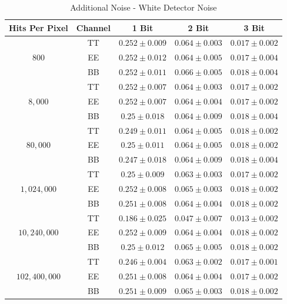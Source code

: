 \documentclass[apj]{emulateapj}
\begin{document}
\def\arraystretch{1.3}
\begin{table}[tbh]
\begin{center}
\caption{\label{tab:extranoisewhite} Additional Noise - White Detector Noise}
\small
\begin{tabular}{c c c c c}
Hits Per Pixel & Channel & 1 Bit & 2 Bit & 3 Bit \\
\hline
\hline
\multirow{3}{*}{$800$}  & TT  & $ 0.252 \pm 0.009 $  & $ 0.064 \pm 0.003 $  & $ 0.017 \pm 0.002 $ \\
& EE  & $ 0.252 \pm 0.012 $  & $ 0.064 \pm 0.005 $  & $ 0.017 \pm 0.004 $ \\
& BB  & $ 0.252 \pm 0.011 $  & $ 0.066 \pm 0.005 $  & $ 0.018 \pm 0.004 $ \\
\hline
\multirow{3}{*}{$8,000$}  & TT  & $ 0.252 \pm 0.007 $  & $ 0.064 \pm 0.003 $  & $ 0.017 \pm 0.002 $ \\
& EE  & $ 0.252 \pm 0.007 $  & $ 0.064 \pm 0.004 $  & $ 0.017 \pm 0.002 $ \\
& BB  & $ 0.25 \pm 0.018 $  & $ 0.064 \pm 0.009 $  & $ 0.018 \pm 0.004 $ \\
\hline
\multirow{3}{*}{$80,000$}  & TT  & $ 0.249 \pm 0.011 $  & $ 0.064 \pm 0.005 $  & $ 0.018 \pm 0.002 $ \\
& EE  & $ 0.25 \pm 0.011 $  & $ 0.064 \pm 0.005 $  & $ 0.018 \pm 0.002 $ \\
& BB  & $ 0.247 \pm 0.018 $  & $ 0.064 \pm 0.009 $  & $ 0.018 \pm 0.004 $ \\
\hline
\multirow{3}{*}{$1,024,000$}  & TT  & $ 0.25 \pm 0.009 $  & $ 0.063 \pm 0.003 $  & $ 0.017 \pm 0.002 $ \\
& EE  & $ 0.252 \pm 0.008 $  & $ 0.065 \pm 0.003 $  & $ 0.018 \pm 0.002 $ \\
& BB  & $ 0.251 \pm 0.008 $  & $ 0.064 \pm 0.004 $  & $ 0.018 \pm 0.002 $ \\
\hline
\multirow{3}{*}{$10,240,000$}  & TT  & $ 0.186 \pm 0.025 $  & $ 0.047 \pm 0.007 $  & $ 0.013 \pm 0.002 $ \\
& EE  & $ 0.252 \pm 0.009 $  & $ 0.064 \pm 0.004 $  & $ 0.018 \pm 0.002 $ \\
& BB  & $ 0.25 \pm 0.012 $  & $ 0.065 \pm 0.005 $  & $ 0.018 \pm 0.002 $ \\
\hline
\multirow{3}{*}{$102,400,000$}  & TT  & $ 0.246 \pm 0.004 $  & $ 0.063 \pm 0.002 $  & $ 0.017 \pm 0.001 $ \\
& EE  & $ 0.251 \pm 0.008 $  & $ 0.064 \pm 0.004 $  & $ 0.017 \pm 0.002 $ \\
& BB  & $ 0.251 \pm 0.009 $  & $ 0.065 \pm 0.003 $  & $ 0.018 \pm 0.002 $ \\
\end{tabular}
 \normalsize
\end{center}
\end{table}
\end{document}
